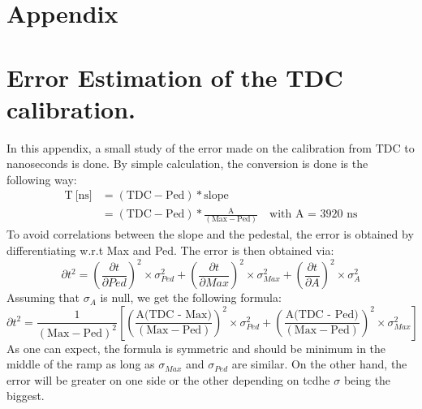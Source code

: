 \documentclass[twoside,a4paper,11pt]{article}
\begin{document}
\clearpage
\begin{appendix}
\section*{Appendix}
\pagestyle{plain}
\renewcommand{\thetable}{A\arabic{table}}

\section{Error Estimation of the TDC calibration.}
\label{appendix:calib_error}

In this appendix, a small study of the error made on the calibration from TDC to nanoseconds is done. By simple calculation, the conversion is done is the following way:
\begin{equation*}
\begin{split}
\text{T} \: \text{[ns]} & = ( \text{TDC} - \text{Ped} ) * \text{slope} \\
& = ( \text{TDC} - \text{Ped} ) * \frac{\text{A}}{(\text{Max} - \text{Ped})} \quad \text{with A = 3920 ns}
\end{split}
\end{equation*}
To avoid correlations between the slope and the pedestal, the error is obtained by differentiating w.r.t Max and Ped. The error is then obtained via:
\begin{equation*}
\partial t^2 = \left(\frac{\partial t}{\partial Ped}\right)^2 \times \sigma_{Ped}^2 + \left(\frac{\partial t}{\partial Max}\right)^2 \times \sigma_{Max}^2 + \left(\frac{\partial t}{\partial A}\right)^2 \times \sigma_{A}^2
\end{equation*}
Assuming that $\sigma_{A}$ is null, we get the following formula:
\begin{equation*}
\partial t^2 = \frac{1}{(\text{Max} - \text{Ped})^2} \left[ \left( \frac{\text{A(TDC - Max)}}{(\text{Max} - \text{Ped})} \right)^2 \times \sigma_{Ped}^2 + \left( \frac{\text{A(TDC - Ped)}}{(\text{Max} - \text{Ped})} \right)^2 \times \sigma_{Max}^2 \right]
\end{equation*}
As one can expect, the formula is symmetric and should be minimum in the middle of the ramp as long as $\sigma_{Max}$ and $\sigma_{Ped}$ are similar. On the other hand, the error will be greater on one side or the other depending on tcdhe $\sigma$ being the biggest. 
\begin{figure}[htbp]

\end{figure}
\end{appendix}
\end{document}
